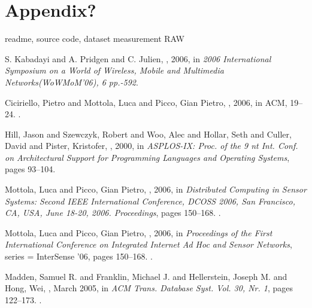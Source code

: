 \documentclass[USenglish]{uit-thesis}
\begin{document}
\chapter{Appendix?}
readme, source code, dataset measurement RAW
\backmatter



\newpage{}

\begin{thebibliography}{9}
S. Kabadayi and A. Pridgen and C. Julien,
, 2006,
\newblock in {\em 2006 International Symposium on a World of Wireless, Mobile and Multimedia Networks(WoWMoM'06), 6 pp.-592}.

Ciciriello, Pietro and Mottola, Luca and Picco, Gian Pietro,
, 2006,
\newblock in {ACM, 19--24}.
.

Hill, Jason and Szewczyk, Robert and Woo, Alec and Hollar, Seth and Culler, David and Pister, Kristofer,
, 2000,
\newblock in {\em  ASPLOS-IX: Proc. of the 9 nt Int. Conf. on
Architectural Support for Programming Languages and
Operating Systems}, pages 93–104.

Mottola, Luca and Picco, Gian Pietro,
, 2006,
\newblock in {\em  Distributed Computing in Sensor Systems: Second IEEE International Conference, DCOSS 2006, San Francisco, CA, USA, June 18-20, 2006. Proceedings}, pages 150--168.
.

Mottola, Luca and Picco, Gian Pietro,
, 2006,
\newblock in {\em  Proceedings of the First International Conference on Integrated Internet Ad Hoc and Sensor Networks},
 series = {InterSense '06}, pages 150--168.
.

Madden, Samuel R. and Franklin, Michael J. and Hellerstein, Joseph M. and Hong, Wei,
, March 2005,
\newblock in {\em  ACM Trans. Database Syst. Vol. 30, Nr. 1}, pages 122--173.
.


\end{thebibliography}
\end{document}
